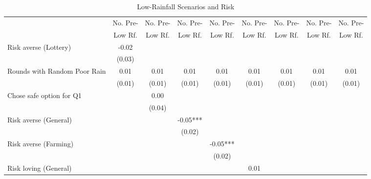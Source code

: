 \begin{table}[htbp]
\centering
\hspace*{-1.2cm}
\begin{threeparttable}
\small
\caption{Low-Rainfall Scenarios and Risk}
\label{tab:B4}
\begin{tabular}{l cccccccc}
\hline
\hline
& No. Pre- & No. Pre- & No. Pre- & No. Pre- & No. Pre- & No. Pre- & No. Pre- & No. Pre- \\
& Low Rf. & Low Rf. & Low Rf. & Low Rf. & Low Rf. & Low Rf. & Low Rf. & Low Rf.  \\ \hline
Risk averse (Lottery)&       -0.02   &               &               &               &               &               &               &               \\
                    &      (0.03)   &               &               &               &               &               &               &               \\
Rounds with Random Poor Rain&        0.01   &        0.01   &        0.01   &        0.01   &        0.01   &        0.01   &        0.01   &        0.01   \\
                    &      (0.01)   &      (0.01)   &      (0.01)   &      (0.01)   &      (0.01)   &      (0.01)   &      (0.01)   &      (0.01)   \\
Chose safe option for Q1&               &        0.00   &               &               &               &               &               &               \\
                    &               &      (0.04)   &               &               &               &               &               &               \\
Risk averse (General)&               &               &       -0.05***&               &               &               &               &               \\
                    &               &               &      (0.02)   &               &               &               &               &               \\
Risk averse (Farming)&               &               &               &       -0.05***&               &               &               &               \\
                    &               &               &               &      (0.02)   &               &               &               &               \\
Risk loving (General)&               &               &               &               &        0.01   &               &               &               \\

\end{tabular}
\end{threeparttable}
\end{table}
